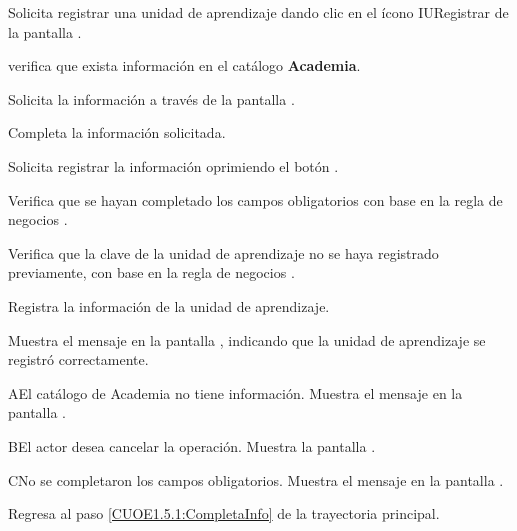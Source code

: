 \begin{UCtrayectoria}
	\UCpaso [\UCactor] Solicita registrar una unidad de aprendizaje dando clic en el ícono IURegistrar de la pantalla . 
	
	\UCpaso[\UCsist] verifica que exista información en el catálogo \textbf{Academia}. 
	
	\UCpaso[\UCsist] Solicita la información a través de la pantalla .
	
	\UCpaso [\UCactor] Completa la información solicitada. \label{CUOE1.5.1:CompletaInfo}
	
	\UCpaso [\UCactor] Solicita registrar la información oprimiendo el botón . 
	
	\UCpaso [\UCsist] Verifica que se hayan completado los campos obligatorios con base en la regla de negocios . 
	
	\UCpaso [\UCsist] Verifica que la clave de la unidad de aprendizaje no se haya registrado previamente, con base en la regla de negocios . 
			
	\UCpaso [\UCsist] Registra la información de la unidad de aprendizaje.
	
	\UCpaso [\UCsist] Muestra el mensaje  en la pantalla , indicando que la unidad de aprendizaje se registró correctamente.	
	
\end{UCtrayectoria}

\begin{UCtrayectoriaA}{A}{El catálogo de Academia no tiene información.}
	\UCpaso [\UCsist] Muestra el mensaje  en la pantalla . 
\end{UCtrayectoriaA}

\begin{UCtrayectoriaA}{B}{El actor desea cancelar la operación.}
	\UCpaso [\UCsist] Muestra la pantalla .  
\end{UCtrayectoriaA}

\begin{UCtrayectoriaA}{C}{No se completaron los campos obligatorios.}
	\UCpaso [\UCsist] Muestra el mensaje  en la pantalla . 
	
	\UCpaso Regresa al paso \ref{CUOE1.5.1:CompletaInfo} de la trayectoria principal.
\end{UCtrayectoriaA}

